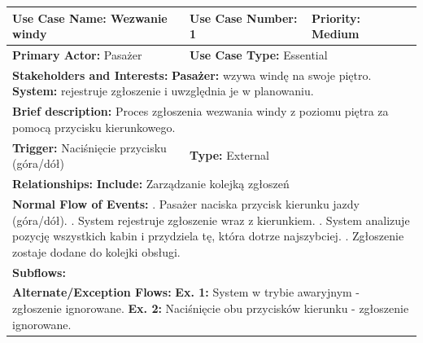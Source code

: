 \documentclass[12pt,a4paper]{article}
\begin{document}
\begin{table}[h!]
\centering
\begin{tabular}{|p{}|p{}|p{}|}
\hline
\textbf{Use Case Name:} Wezwanie windy & \textbf{Use Case Number:} 1 & \textbf{Priority:} Medium \\ \hline
\textbf{Primary Actor:} Pasażer & \multicolumn{2}{l|}{\textbf{Use Case Type:} Essential} \\ \hline
\multicolumn{3}{|p{0.9\textwidth}|}{\textbf{Stakeholders and Interests:} \newline
\textbf{Pasażer:} wzywa windę na swoje piętro. \newline
\textbf{System:} rejestruje zgłoszenie i uwzględnia je w planowaniu.} \\ \hline
\multicolumn{3}{|p{0.9\textwidth}|}{\textbf{Brief description:} Proces zgłoszenia wezwania windy z poziomu piętra za pomocą przycisku kierunkowego.} \\ \hline
\textbf{Trigger:} Naciśnięcie przycisku (góra/dół) & \multicolumn{2}{l|}{\textbf{Type:} External} \\ \hline
\multicolumn{3}{|p{0.9\textwidth}|}{\textbf{Relationships:} \newline
\textbf{Include:} Zarządzanie kolejką zgłoszeń } \\ \hline
\multicolumn{3}{|p{0.9\textwidth}|}{\textbf{Normal Flow of Events:} \newline
1. Pasażer naciska przycisk kierunku jazdy (góra/dół). \newline
2. System rejestruje zgłoszenie wraz z kierunkiem. \newline
3. System analizuje pozycję wszystkich kabin i przydziela tę, która dotrze najszybciej. \newline
4. Zgłoszenie zostaje dodane do kolejki obsługi.} \\ \hline
\multicolumn{3}{|p{0.9\textwidth}|}{\textbf{Subflows:}} \\ \hline
\multicolumn{3}{|p{0.9\textwidth}|}{\textbf{Alternate/Exception Flows:} \newline
\textbf{Ex. 1:} System w trybie awaryjnym - zgłoszenie ignorowane. \newline
\textbf{Ex. 2:} Naciśnięcie obu przycisków kierunku - zgłoszenie ignorowane.} \\ \hline
\end{tabular}
\end{table}

\newpage
\end{document}
